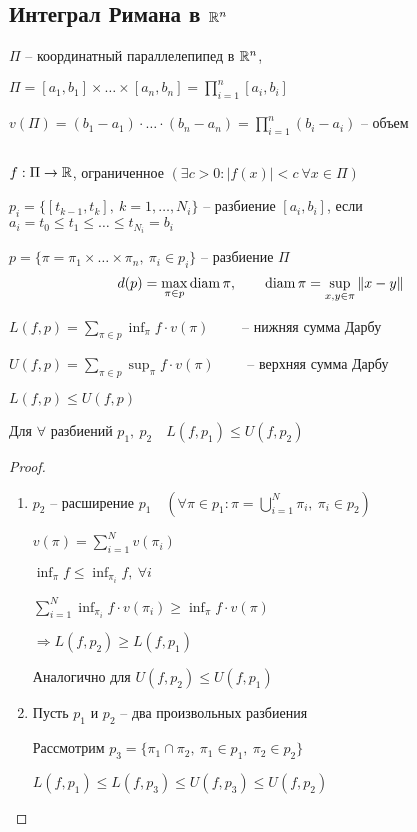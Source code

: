     \subsection*{Интеграл Римана в $\mathbb{R}^n$}

    $\Pi$ -- координатный параллелепипед в $\mathbb{R}^n$,
    \par $\Pi = [a_1, b_1] \times \dots \times [a_n, b_n] = \prod_{i=1}^n [a_i, b_i]$
    \par $v(\Pi) = (b_1 - a_1) \cdot \dots \cdot (b_n - a_n) = \prod_{i=1}^n (b_i - a_i)$ -- объем
    \par $ $
    \par $f : \Pi \rightarrow \mathbb{R}$, ограниченное \quad $(\exists c > 0 : |f(x)| < c \ \forall x \in \Pi)$
    \par $p_i = \{[t_{k-1}, t_k], \ k = 1, \dots, N_i\}$ -- разбиение $[a_i, b_i]$, если $a_i = t_0 \le t_1 \le \dots \le t_{N_i} = b_i$
    \par $p = \{\pi = \pi_1 \times \dots \times \pi_n, \ \pi_i \in p_i\}$ -- разбиение $\Pi$
    \[
        d(p) = \max_{\pi \in p} \operatorname{diam} \pi, \qquad \operatorname{diam} \pi = \sup_{x, y \in \pi} \|x - y\|    
    \]
    \par $L(f, p) = \sum_{\pi \in p} \inf_\pi f \cdot v(\pi) \qquad$ -- нижняя сумма Дарбу
    \par $U(f, p) = \sum_{\pi \in p} \sup_\pi f \cdot v(\pi) \qquad$ -- верхняя сумма Дарбу
    \par $L(f, p) \le U(f, p)$

    \begin{lemma}
        Для $\forall$ разбиений $p_1, \ p_2 \quad L(f, p_1) \le U(f, p_2)$
    \end{lemma}
    \begin{proof}
        $ $
        \begin{enumerate}
            \item $p_2$ -- расширение $p_1 \quad (\forall \pi \in p_1 : \pi = \bigcup_{i=1}^N \pi_i, \ \pi_i \in p_2)$
                \par $v(\pi) = \sum_{i=1}^N v(\pi_i)$
                \par $\inf_\pi f \le \inf_{\pi_i} f, \ \forall i$
                \par $\sum_{i=1}^N \inf_{\pi_i} f \cdot v(\pi_i) \ge \inf_\pi f \cdot v(\pi)$
                \par $\Rightarrow L(f, p_2) \ge L(f, p_1)$
                \par Аналогично для $U(f, p_2) \le U(f, p_1)$
            \item Пусть $p_1$ и $p_2$ -- два произвольных разбиения
                \par Рассмотрим $p_3 = \{\pi_1 \cap \pi_2, \ \pi_1 \in p_1, \ \pi_2 \in p_2\}$
                \par $L(f, p_1) \le L(f, p_3) \le U(f, p_3) \le U(f, p_2)$
        \end{enumerate}
    \end{proof}

